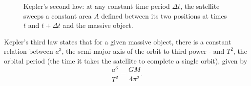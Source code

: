 \begin{figure}
  \begin{center}
  \end{center}
  \caption{Kepler's second law: at any constant time period $\Delta t$, the satellite sweeps a constant area $A$ defined between its two positions at times $t$ and $t+\Delta t$ and the massive object.}
  \label{fig:keplers_2nd_law}
\end{figure}

Kepler's third law states that for a given massive object, there is a constant relation between $a^{3}$, the semi-major axis of the orbit to third power - and $T^{2}$, the orbital period (the time it takes the satellite to complete a single orbit), given by
\begin{equation}
  \frac{a^{3}}{T^{2}} = \frac{GM}{4\pi^{2}}.
  \label{eq:keplers_3rd_law}
\end{equation}


